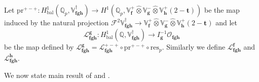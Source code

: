 \documentclass[a4paper,11pt]{amsart}
\theoremstyle{plain}
\theoremstyle{definition}
\newtheorem{definition}[theorem]{Definition}
\theoremstyle{remark}
\newcommand{\bb}{\mathbb}
\newcommand{\cl}{\mathcal}
\DeclareMathOperator{\bal}{bal}
\newcommand{\Sel}{\mathrm{Sel}}
\newcommand{\hf}{{\mathbf{f}}}
\newcommand{\hg}{{\mathbf{g}}}
\newcommand{\hh}{{\mathbf h}}
\newcommand{\res}{\mathrm{res}}
\numberwithin{equation}{section}
\begin{document}
Let $\mathrm{pr}^{+-+}:H^1_{\bal}(\bb{Q}_p,\bb{V}_{\hf\hg\hh}^\dagger)\rightarrow H^1(\bb{Q}_p,\bb{V}_{\hf}^+\hat{\otimes}\bb{V}_{\hg}^-\hat{\otimes}\bb{V}_\hh^+(2-\mathbf{t}))$ be the map induced by the natural projection $\mathscr{F}^2\bb{V}_{\hf\hg\hh}^\dagger\rightarrow \bb{V}_{\hf}^+\hat{\otimes}\bb{V}_\hg^-\hat{\otimes}\bb{V}_\hh^+(2-\mathbf{t})$ and let
\[
\mathcal{L}_{\hf\hg\hh}^{\hg}:H^1_{\bal}(\bb{Q},\bb{V}_{\hf\hg\hh}^\dagger)\longrightarrow I_{\hg}^{-1}\cl{O}_{\hf\hg\hh}
\]
be the map defined by $\mathcal{L}_{\hf\hg\hh}^\hg=\mathcal{L}_{\hf\hg\hh}^{+-+}\circ \mathrm{pr}^{+-+}\circ \res_p$. Similarly we define $\mathcal{L}_{\hf\hg\hh}^\hf$ and $\mathcal{L}_{\hf\hg\hh}^\hh$. 

We now state main result of \cite{DR3} and \cite{BSV}.
\end{document}
